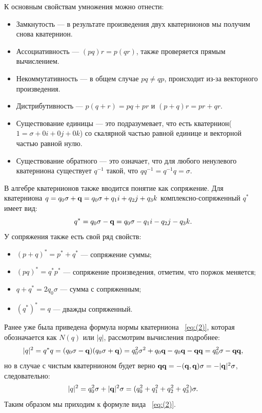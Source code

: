 К основным свойствам умножения можно отнести:
\begin{itemize}
    \item Замкнутость --- в результате произведения двух кватернионов мы получим снова кватернион.
    \item Ассоциативность --- $(pq)r = p(qr)$, также проверяется прямым вычислением.
    \item Некоммутативность --- в общем случае $pq \neq qp$, происходит из-за векторного произведения.
    \item Дистрибутивность --- $p(q+r) = pq + pr$ и $(p+q)r = pr + qr$.
    \item Существование единицы --- это подразумевает, что есть кватернион($1 = \sigma + 0i + 0j + 0k$)  со скалярной частью равной единице и векторной частью равной нулю.
    \item Существование обратного --- это означает, что для любого ненулевого кватерниона существует $q^{-1}$ такой, что $q q^{-1} = q^{-1} q = \sigma$.
\end{itemize}

В алгебре кватернионов также вводится понятие как сопряжение. Для кватерниона $q = q_0 \sigma + \vb{q} = q_0 \sigma + q_1 i + q_2 j + q_3 k$ комплексно-сопряженный $q^*$ имеет вид:
\begin{equation*}
    q^* = q_0 \sigma - \vb{q} = q_0 \sigma - q_1 i - q_2 j - q_3 k.
\end{equation*}
У сопряжения также есть свой ряд свойств:
\begin{itemize}
    \item $(p + q)^* = p^* + q^*$ --- сопряжение суммы;
    \item $(pq)^* = q^* p^*$ --- сопряжение произведения, отметим, что поржок меняется;
    \item $q + q^* = 2q_0 \sigma$ --- сумма с сопряженным;
    \item $(q^*)^* = q$ --- дважды сопряженный.
\end{itemize}

Ранее уже была приведена формула нормы кватерниона ~\eqref{eq:(2)}, которая обозначается как $N(q)$ или $|q|$, рассмотрим вычисления подробнее:
\begin{multline*}
    |q|^2 = q^* q = (q_0 \sigma - \vb{q})(q_0 \sigma + \vb{q}) = q_0^2 \sigma^2 + q_0 \vb{q} - q_0 \vb{q} - \vb{q}\vb{q} = q_0^2 \sigma - \vb{q}\vb{q},
\end{multline*}
но в случае с чистым кватернионом будет верно $\vb{q}\vb{q} = -(\vb{q},\vb{q})\sigma = -|\vb{q}|^2 \sigma$, следовательно:
\begin{equation*}
    |q|^2 = q_0^2 \sigma + |\vb{q}|^2 \sigma = (q_0^2 + q_1^2 + q_2^2 + q_3^2)\sigma.
\end{equation*}
Таким образом мы приходим к формуле вида ~\eqref{eq:(2)}.

